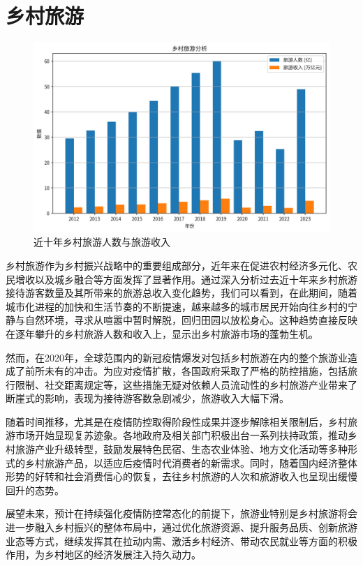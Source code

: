 \chapter{乡村旅游}
\label{chapter:travel}

\begin{figure}[htbp]
    \centering
    \includegraphics[width=0.5\linewidth]{figures/10.png}
    \caption{近十年乡村旅游人数与旅游收入}
\end{figure}


乡村旅游作为乡村振兴战略中的重要组成部分，近年来在促进农村经济多元化、农民增收以及城乡融合等方面发挥了显著作用。通过深入分析过去近十年来乡村旅游接待游客数量及其所带来的旅游总收入变化趋势，我们可以看到，在此期间，随着城市化进程的加快和生活节奏的不断提速，越来越多的城市居民开始向往乡村的宁静与自然环境，寻求从喧嚣中暂时解脱，回归田园以放松身心。这种趋势直接反映在逐年攀升的乡村旅游人数和收入上，显示出乡村旅游市场的蓬勃生机。

然而，在2020年，全球范围内的新冠疫情爆发对包括乡村旅游在内的整个旅游业造成了前所未有的冲击。为应对疫情扩散，各国政府采取了严格的防控措施，包括旅行限制、社交距离规定等，这些措施无疑对依赖人员流动性的乡村旅游产业带来了断崖式的影响，表现为接待游客数急剧减少，旅游收入大幅下滑。

随着时间推移，尤其是在疫情防控取得阶段性成果并逐步解除相关限制后，乡村旅游市场开始显现复苏迹象。各地政府及相关部门积极出台一系列扶持政策，推动乡村旅游产业升级转型，鼓励发展特色民宿、生态农业体验、地方文化活动等多种形式的乡村旅游产品，以适应后疫情时代消费者的新需求。同时，随着国内经济整体形势的好转和社会消费信心的恢复，去往乡村旅游的人次和旅游收入也呈现出缓慢回升的态势。

展望未来，预计在持续强化疫情防控常态化的前提下，旅游业特别是乡村旅游将会进一步融入乡村振兴的整体布局中，通过优化旅游资源、提升服务品质、创新旅游业态等方式，继续发挥其在拉动内需、激活乡村经济、带动农民就业等方面的积极作用，为乡村地区的经济发展注入持久动力。